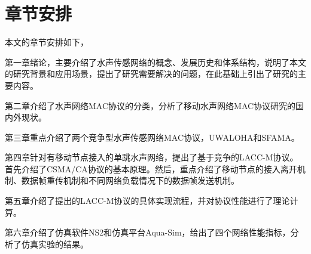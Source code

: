 \section{章节安排}
本文的章节安排如下，

第一章绪论，主要介绍了水声传感网络的概念、发展历史和体系结构，说明了本文的研究背景和应用场景，提出了研究需要解决的问题，在此基础上引出了研究的主要内容。

第二章介绍了水声网络MAC协议的分类，分析了移动水声网络MAC协议研究的国内外现状。

第三章重点介绍了两个竞争型水声传感网络MAC协议，UWALOHA和SFAMA。

第四章针对有移动节点接入的单跳水声网络，提出了基于竞争的LACC-M协议。首先介绍了CSMA/CA协议的基本原理。然后，重点介绍了移动节点的接入离开机制、数据帧重传机制和不同网络负载情况下的数据帧发送机制。

第五章介绍了提出的LACC-M协议的具体实现流程，并对协议性能进行了理论计算。

第六章介绍了仿真软件NS2和仿真平台Aqua-Sim，给出了四个网络性能指标，分析了仿真实验的结果。

\endinput